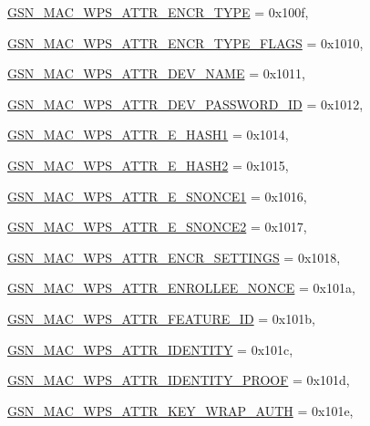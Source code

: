 \begin{DoxyCompactItemize}
\par
\hyperlink{a00642_gga0ae19d69a0b381d883890df8a7812414a0f7ef631b9b5172cdeaac0f6d57be68b}{GSN\_\-MAC\_\-WPS\_\-ATTR\_\-ENCR\_\-TYPE} =  0x100f, 
\par
\hyperlink{a00642_gga0ae19d69a0b381d883890df8a7812414a1bccefdc1fb8e59b0f1b2143760a6644}{GSN\_\-MAC\_\-WPS\_\-ATTR\_\-ENCR\_\-TYPE\_\-FLAGS} =  0x1010, 
\par
\hyperlink{a00642_gga0ae19d69a0b381d883890df8a7812414ac600b93117d1fd53e66ed52e54699451}{GSN\_\-MAC\_\-WPS\_\-ATTR\_\-DEV\_\-NAME} =  0x1011, 
\par
\hyperlink{a00642_gga0ae19d69a0b381d883890df8a7812414a08ccfbe8970a56aae777bf20f46d3b65}{GSN\_\-MAC\_\-WPS\_\-ATTR\_\-DEV\_\-PASSWORD\_\-ID} =  0x1012, 
\par
\hyperlink{a00642_gga0ae19d69a0b381d883890df8a7812414affb3ee90dc1870d4a399814ef2e72f7b}{GSN\_\-MAC\_\-WPS\_\-ATTR\_\-E\_\-HASH1} =  0x1014, 
\par
\hyperlink{a00642_gga0ae19d69a0b381d883890df8a7812414a077695e5257e9e646d38ab4d649df7d7}{GSN\_\-MAC\_\-WPS\_\-ATTR\_\-E\_\-HASH2} =  0x1015, 
\par
\hyperlink{a00642_gga0ae19d69a0b381d883890df8a7812414a148038d92c6054711427dd01c4178df3}{GSN\_\-MAC\_\-WPS\_\-ATTR\_\-E\_\-SNONCE1} =  0x1016, 
\par
\hyperlink{a00642_gga0ae19d69a0b381d883890df8a7812414ad67e234cf3cd78d829db04fd1d76d592}{GSN\_\-MAC\_\-WPS\_\-ATTR\_\-E\_\-SNONCE2} =  0x1017, 
\par
\hyperlink{a00642_gga0ae19d69a0b381d883890df8a7812414a061dcf9ed592316d74edafcbdd408abc}{GSN\_\-MAC\_\-WPS\_\-ATTR\_\-ENCR\_\-SETTINGS} =  0x1018, 
\par
\hyperlink{a00642_gga0ae19d69a0b381d883890df8a7812414a6e68d887428b6b8305aa9c18cb3d1c5a}{GSN\_\-MAC\_\-WPS\_\-ATTR\_\-ENROLLEE\_\-NONCE} =  0x101a, 
\par
\hyperlink{a00642_gga0ae19d69a0b381d883890df8a7812414a522f5dba15cb3d3aacdcd036e2b59150}{GSN\_\-MAC\_\-WPS\_\-ATTR\_\-FEATURE\_\-ID} =  0x101b, 
\par
\hyperlink{a00642_gga0ae19d69a0b381d883890df8a7812414ab35724dadfe61d6ee4b8db2c26f5d592}{GSN\_\-MAC\_\-WPS\_\-ATTR\_\-IDENTITY} =  0x101c, 
\par
\hyperlink{a00642_gga0ae19d69a0b381d883890df8a7812414addddcc8e24644c522a4b64a303dad605}{GSN\_\-MAC\_\-WPS\_\-ATTR\_\-IDENTITY\_\-PROOF} =  0x101d, 
\par
\hyperlink{a00642_gga0ae19d69a0b381d883890df8a7812414ac6599d36351e718ee91228713e9ea30b}{GSN\_\-MAC\_\-WPS\_\-ATTR\_\-KEY\_\-WRAP\_\-AUTH} =  0x101e, 

\end{DoxyCompactItemize}
